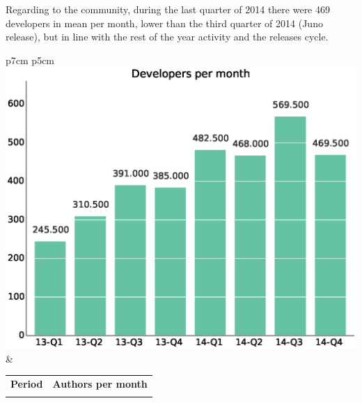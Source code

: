 \documentclass[a4wide,11pt]{report}
\begin{document}





Regarding to the community, during the last quarter of 2014 there were 469 developers in mean per month, lower than the third quarter of 2014 (Juno release), but in line with the rest of the year activity and the releases cycle.

\begin{tabular}{p{7cm} p{5cm}}
    \vspace{0pt} 
    \includegraphics[scale=.35]{figs/authors_month.eps}
    & 
    \vspace{0pt}
    \begin{tabular}{l|r|}%
    \bfseries Period & \bfseries Authors per month%
   \csvreader[head to column names]{data/authors_month.csv}{}%
   {\\ & \authormonth}
   \end{tabular}
\end{tabular}
\end{document}
